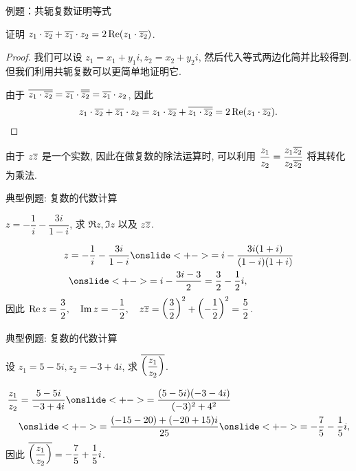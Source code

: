 \begin{frame}{例题：共轭复数证明等式}
\begin{example}
证明 $z_1\cdot\overline{z_2}+\overline{z_1}\cdot z_2=2\operatorname{Re}(z_1\cdot\overline{z_2})$.
\end{example}
\begin{proof}
\indent
我们可以设 $z_1=x_1+y_1i,z_2=x_2+y_2i$, 然后代入等式两边化简并比较得到.
\onslide<+->
但我们利用共轭复数可以更简单地证明它.

\indent
\onslide<+->
由于 $\overline{z_1\cdot\overline{z_2}}=\overline{z_1}\cdot\overline{\overline{z_2}}=\overline{z_1}\cdot z_2$, 
\onslide<+->
因此
\[z_1\cdot\overline{z_2}+\overline{z_1}\cdot z_2
=z_1\cdot\overline{z_2}+\overline{z_1\cdot\overline{z_2}}
=2\operatorname{Re}(z_1\cdot\overline{z_2}).\qedhere\]
\end{proof}
\onslide<+->
由于 $z\overline z$ 是一个实数,
\onslide<+->
因此在做复数的除法运算时, 可以利用
$\dfrac{z_1}{z_2}=\dfrac{z_1\overline{z_2}}{z_2\overline{z_2}}$
将其转化为乘法.
\end{frame}


\begin{frame}{典型例题: 复数的代数计算}
\begin{example}
$z=-\dfrac1i-\dfrac{3i}{1-i}$, 求 $\Re z,\Im z$ 以及 $z\overline z$.
\end{example}
\begin{solution}
\begin{align*}
z&=-\frac1i-\frac{3i}{1-i}
\onslide<+->{=i-\frac{3i(1+i)}{(1-i)(1+i)}}\\
&\onslide<+->{=i-\frac{3i-3}2=\frac32-\frac12i,}
\end{align*}
\onslide<+->
因此
$\displaystyle\operatorname{Re} z=\frac32,\quad\operatorname{Im} z=-\frac12,\quad
z\overline z=\left(\frac32\right)^2+\left(-\frac12\right)^2=\frac52$.
\end{solution}
\end{frame}


\begin{frame}{典型例题: 复数的代数计算}
\begin{example}
设 $z_1=5-5i,z_2=-3+4i$, 求 $\overline{\left(\dfrac{z_1}{z_2}\right)}$.
\end{example}
\begin{solution}
\begin{align*}
\frac{z_1}{z_2}&=\frac{5-5i}{-3+4i}
\onslide<+->{=\frac{(5-5i)(-3-4i)}{(-3)^2+4^2}}\\
&\onslide<+->{=\frac{(-15-20)+(-20+15)i}{25}}
\onslide<+->{=-\frac75-\frac15i,}
\end{align*}
\onslide<+->
因此 $\overline{\left(\dfrac{z_1}{z_2}\right)}=-\dfrac75+\dfrac15i$.
\end{solution}
\end{frame}


